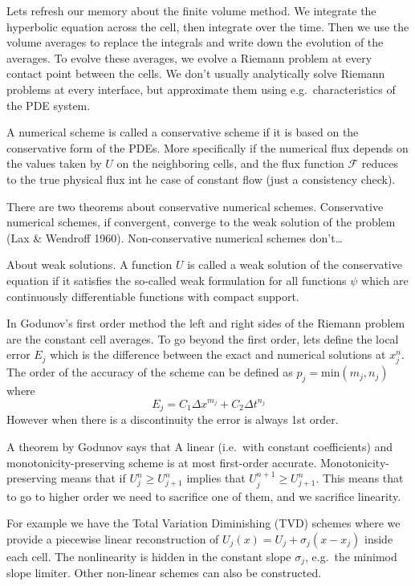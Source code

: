 \documentclass[letterpaper, 11pt]{article}
\numberwithin{equation}{section}
\numberwithin{figure}{section}
\begin{document}
Lets refresh our memory about the finite volume method. We integrate the
hyperbolic equation across the cell, then integrate over the time. Then we use
the volume averages to replace the integrals and write down the evolution of the
averages. To evolve these averages, we evolve a Riemann problem at every
contact point between the cells. We don't usually analytically solve Riemann
problems at every interface, but approximate them using e.g.\ characteristics of
the PDE system.

A numerical scheme is called a conservative scheme if it is based on the
conservative form of the PDEs. More specifically if the numerical flux depends
on the values taken by $U$ on the neighboring cells, and the flux function
$\mathcal{F}$ reduces to the true physical flux int he case of constant flow
(just a consistency check).

There are two theorems about conservative numerical schemes. Conservative
numerical schemes, if convergent, converge to the weak solution of the problem
(Lax \& Wendroff 1960). Non-conservative numerical schemes don't\dots

About weak solutions. A function $U$ is called a weak solution of the
conservative equation if it satisfies the so-called weak formulation for all
functions $\psi$ which are continuously differentiable functions with compact
support.

In Godunov's first order method the left and right sides of the Riemann problem
are the constant cell averages. To go beyond the first order, lets define the
local error $E_{j}$ which is the difference between the exact and numerical
solutions at $x_j^n$. The order of the accuracy of the scheme can be defined as
$p_j = \mathrm{min}(m_j, n_j)$ where
\begin{equation}
  \label{eq:4}
  E_j = C_1\Delta x^{m_j} + C_2\Delta t^{n_j}
\end{equation}
However when there is a discontinuity the error is always 1st order.

A theorem by Godunov says that A linear (i.e.\ with constant coefficients) and
monotonicity-preserving scheme is at most first-order accurate.
Monotonicity-preserving means that if $U_j^n \geq U_{j+1}^n$ implies that
$U_j^{n+1} \geq U_{j+1}^n$. This means that to go to higher order we need to
sacrifice one of them, and we sacrifice linearity.

For example we have the Total Variation Diminishing (TVD) schemes where we
provide a piecewise linear reconstruction of $U_{j}(x) = U_j + \sigma_j(x -
x_j)$ inside each cell. The nonlinearity is hidden in the constant slope
$\sigma_j$, e.g.\ the minimod slope limiter. Other non-linear schemes can also
be constructed.
\end{document}
